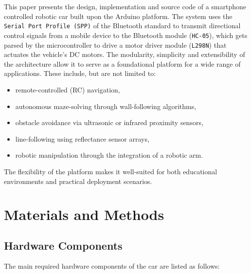 \documentclass[
 fontsize  = 11,                 %
%
 imagesupport = true, %
 tablesupport = true, %
 urlsupport   = true, %
%
 docstyleTitleStyle         = scientificpaper %
%
]{my_style}
\begin{document}
 This paper presents the design, implementation and source code of a smartphone controlled robotic car built upon the Arduino platform.
 The system uses the \texttt{Serial Port Profile (SPP)} of the Bluetooth standard to transmit directional control signals from a mobile device to the Bluetooth module (\texttt{HC-05}), which gets parsed by the microcontroller to drive a motor driver module (\texttt{L298N}) that actuates the vehicle's DC motors.
 The modularity, simplicity and extensibility of the architecture allow it to serve as a foundational platform for a wide range of applications.
 These include, but are not limited to:
 \begin{itemize}
  \item remote-controlled (RC) navigation,
  \item autonomous maze-solving through wall-following algorithms,
  \item obstacle avoidance via ultrasonic or infrared proximity sensors,
  \item line-following using reflectance sensor arrays,
  \item robotic manipulation through the integration of a robotic arm.
 \end{itemize}

 The flexibility of the platform makes it well-suited for both educational environments and practical deployment scenarios.

 \chapter{Materials and Methods}
 \section{Hardware Components}
 The main required hardware components of the car are listed as follows:
\end{document}
